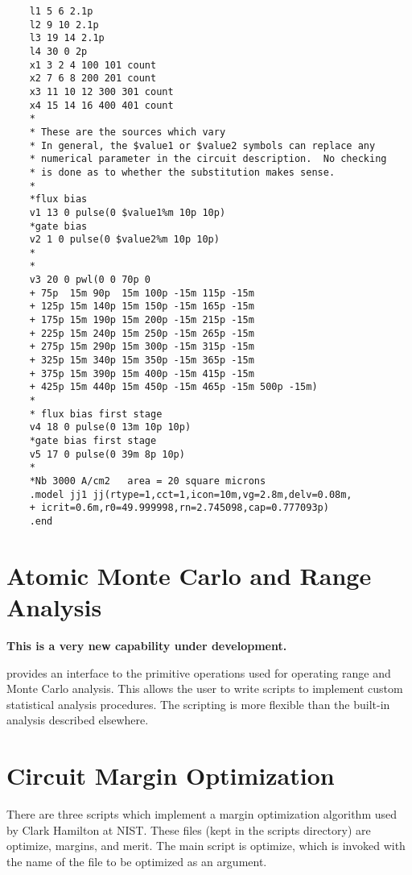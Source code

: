 \begin{verbatim}
    l1 5 6 2.1p
    l2 9 10 2.1p
    l3 19 14 2.1p
    l4 30 0 2p
    x1 3 2 4 100 101 count
    x2 7 6 8 200 201 count
    x3 11 10 12 300 301 count
    x4 15 14 16 400 401 count
    *
    * These are the sources which vary
    * In general, the $value1 or $value2 symbols can replace any
    * numerical parameter in the circuit description.  No checking
    * is done as to whether the substitution makes sense.
    *
    *flux bias
    v1 13 0 pulse(0 $value1%m 10p 10p)
    *gate bias
    v2 1 0 pulse(0 $value2%m 10p 10p)
    *
    *
    v3 20 0 pwl(0 0 70p 0
    + 75p  15m 90p  15m 100p -15m 115p -15m 
    + 125p 15m 140p 15m 150p -15m 165p -15m
    + 175p 15m 190p 15m 200p -15m 215p -15m
    + 225p 15m 240p 15m 250p -15m 265p -15m
    + 275p 15m 290p 15m 300p -15m 315p -15m
    + 325p 15m 340p 15m 350p -15m 365p -15m
    + 375p 15m 390p 15m 400p -15m 415p -15m
    + 425p 15m 440p 15m 450p -15m 465p -15m 500p -15m)
    *
    * flux bias first stage
    v4 18 0 pulse(0 13m 10p 10p)
    *gate bias first stage
    v5 17 0 pulse(0 39m 8p 10p)
    *
    *Nb 3000 A/cm2   area = 20 square microns
    .model jj1 jj(rtype=1,cct=1,icon=10m,vg=2.8m,delv=0.08m,
    + icrit=0.6m,r0=49.999998,rn=2.745098,cap=0.777093p)
    .end
\end{verbatim}


\section{Atomic Monte Carlo and Range Analysis}
\label{atomic}


{\bf This is a very new capability under development.}

{\WRspice} provides an interface to the primitive operations used for
operating range and Monte Carlo analysis.  This allows the user to
write scripts to implement custom statistical analysis procedures. 
The scripting is more flexible than the built-in analysis described
elsewhere.


\section{Circuit Margin Optimization}


There are three scripts which implement a margin optimization
algorithm used by Clark Hamilton at NIST.  These files (kept in the
scripts directory) are {\vt optimize}, {\vt margins}, and {\vt merit}. 
The main script is {\vt optimize}, which is invoked with the name of
the file to be optimized as an argument.

